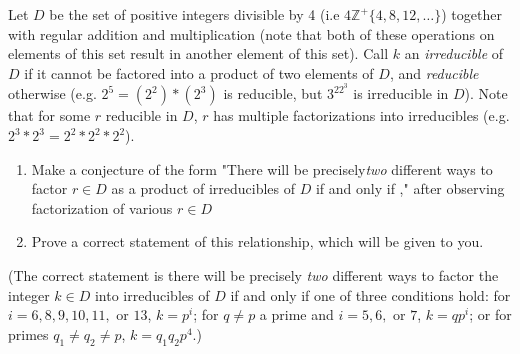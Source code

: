 \documentclass[letterpaper,12pt]{article}
\def\Z{\mathbb Z}
\begin{document}
Let $D$ be the set of positive integers divisible by 4 (i.e $4\Z^+\{4,8,12,\dots\}$) together with regular addition and multiplication (note that both of these operations on elements of this set result in another element of this set).
Call $k$ an \emph{irreducible} of $D$ if it cannot be factored into a product of two elements of $D$, and \emph{reducible} otherwise (e.g. $2^5=(2^2)*(2^3)$ is reducible, but $3^22^3$ is irreducible in $D$). Note that for some $r$ reducible in $D$, $r$ has multiple factorizations into irreducibles (e.g. $2^3*2^3=2^2*2^2*2^2$).

\begin{enumerate}
\item Make a conjecture of the form "There will be precisely\emph{two} different ways to factor $r\in D$ as a product of irreducibles of $D$ if and only if \underline{\hspace{3cm}}," after observing factorization of various $r\in D$

\item  Prove a correct statement of this relationship, which will be given to you.

\end{enumerate}
(The correct statement is there will be precisely \emph{two} different ways to factor the integer $k\in D$ into irreducibles of $D$ if and only if one of three conditions hold: for $i=6,8,9,10,11,$ or $13$, $k=p^i$; for $q\ne p$ a prime and $i=5,6,$ or $7$, $k=qp^i$; or for primes $q_1\ne q_2\ne p$, $k=q_1q_2p^4$.)
\end{document}
